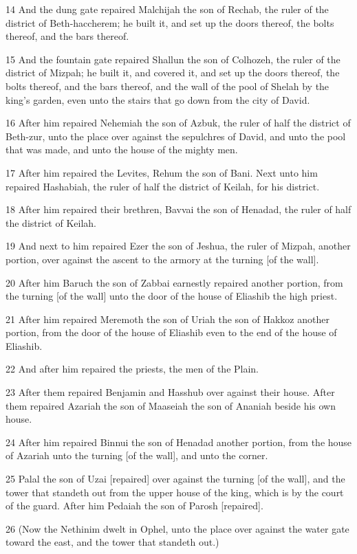 \par 14 And the dung gate repaired Malchijah the son of Rechab, the ruler of the district of Beth-haccherem; he built it, and set up the doors thereof, the bolts thereof, and the bars thereof.
\par 15 And the fountain gate repaired Shallun the son of Colhozeh, the ruler of the district of Mizpah; he built it, and covered it, and set up the doors thereof, the bolts thereof, and the bars thereof, and the wall of the pool of Shelah by the king's garden, even unto the stairs that go down from the city of David.
\par 16 After him repaired Nehemiah the son of Azbuk, the ruler of half the district of Beth-zur, unto the place over against the sepulchres of David, and unto the pool that was made, and unto the house of the mighty men.
\par 17 After him repaired the Levites, Rehum the son of Bani. Next unto him repaired Hashabiah, the ruler of half the district of Keilah, for his district.
\par 18 After him repaired their brethren, Bavvai the son of Henadad, the ruler of half the district of Keilah.
\par 19 And next to him repaired Ezer the son of Jeshua, the ruler of Mizpah, another portion, over against the ascent to the armory at the turning [of the wall].
\par 20 After him Baruch the son of Zabbai earnestly repaired another portion, from the turning [of the wall] unto the door of the house of Eliashib the high priest.
\par 21 After him repaired Meremoth the son of Uriah the son of Hakkoz another portion, from the door of the house of Eliashib even to the end of the house of Eliashib.
\par 22 And after him repaired the priests, the men of the Plain.
\par 23 After them repaired Benjamin and Hasshub over against their house. After them repaired Azariah the son of Maaseiah the son of Ananiah beside his own house.
\par 24 After him repaired Binnui the son of Henadad another portion, from the house of Azariah unto the turning [of the wall], and unto the corner.
\par 25 Palal the son of Uzai [repaired] over against the turning [of the wall], and the tower that standeth out from the upper house of the king, which is by the court of the guard. After him Pedaiah the son of Parosh [repaired].
\par 26 (Now the Nethinim dwelt in Ophel, unto the place over against the water gate toward the east, and the tower that standeth out.)
